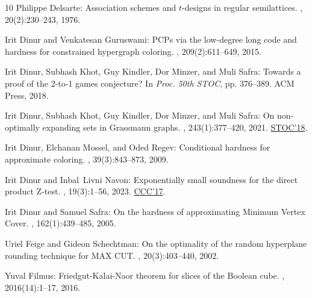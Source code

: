 \documentclass[11pt]{article}
\begin{document}
\begin{thebibliography}{10}
{\sc Philippe Delsarte}: Association schemes and $t$-designs in regular
  semilattices.
, 20(2):230--243, 1976.
\newblock [\epfmtdoi{10.1016/0097-3165(76)90017-0}]

{\sc Irit Dinur and Venkatesan Guruswami}: {PCP}s via the low-degree long code
  and hardness for constrained hypergraph coloring.
, 209(2):611--649, 2015.
\newblock [\epfmtdoi{10.1007/s11856-015-1231-3}]

{\sc Irit Dinur, Subhash Khot, Guy Kindler, Dor Minzer, and Muli Safra}:
  Towards a proof of the 2-to-1 games conjecture?
\newblock In {\em Proc. 50th STOC}, pp. 376--389. ACM Press, 2018.
\newblock [\epfmtdoi{10.1145/3188745.3188804}]

{\sc Irit Dinur, Subhash Khot, Guy Kindler, Dor Minzer, and Muli Safra}: On
  non-optimally expanding sets in {G}rassmann graphs.
, 243(1):377--420, 2021.
\newblock \prelim \href{https://doi.org/10.1145/3188745.3188806}{STOC'18}.
\newblock [\epfmtdoi{10.1007/s11856-021-2164-7}]

{\sc Irit Dinur, Elchanan Mossel, and Oded Regev}: Conditional hardness for
  approximate coloring.
, 39(3):843--873, 2009.
\newblock [\epfmtdoi{10.1137/07068062X}]

{\sc Irit Dinur and Inbal~Livni Navon}: Exponentially small soundness for the
  direct product {Z}-test.
, 19(3):1--56, 2023.
\newblock \prelim \href{https://doi.org/10.4230/LIPIcs.CCC.2017.29}{CCC'17}.

{\sc Irit Dinur and Samuel Safra}: On the hardness of approximating {Minimum
  Vertex Cover}.
, 162(1):439--485, 2005.

{\sc Uriel Feige and Gideon Schechtman}: On the optimality of the random
  hyperplane rounding technique for {MAX CUT}.
, 20(3):403--440, 2002.

{\sc Yuval Filmus}: {Friedgut}-{Kalai}-{Naor} theorem for slices of the
  {Boolean} cube.
, 2016(14):1--17, 2016.


\end{thebibliography}
\end{document}
